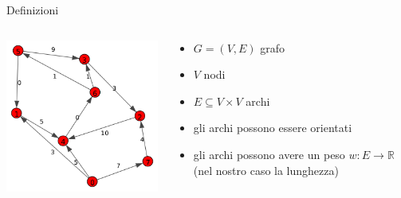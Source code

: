 \documentclass{beamer}
\theoremstyle{plain}
\theoremstyle{definition}
\theoremstyle{remark}
\begin{document}
\begin{frame}{Definizioni}
  \begin{columns}
    \begin{column}{0.40\textwidth}
      \includegraphics[width=\textwidth]{directgraph}
    \end{column}
    \begin{column}{0.58\textwidth}
      \begin{itemize}
      \item $G = (V,E)$ grafo
      \item $V$ nodi
      \item $E \subseteq V\times V$ archi
      \item gli archi possono essere orientati
      \item gli archi possono avere un peso $w: E \to \mathbb{R}$ (nel
        nostro caso la lunghezza)
      \end{itemize}
    \end{column}
  \end{columns}
\end{frame}
\end{document}
